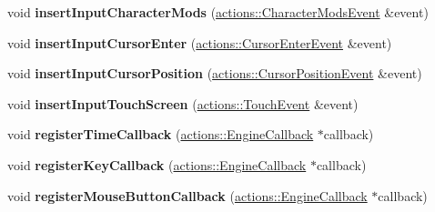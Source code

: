 \begin{DoxyCompactItemize}
\item 
\hypertarget{classfillwave_1_1Engine_a1d533273542291e94666e02bdf2035a6}{}void {\bfseries insert\+Input\+Character\+Mods} (\hyperlink{classfillwave_1_1actions_1_1CharacterModsEvent}{actions\+::\+Character\+Mods\+Event} \&event)\label{classfillwave_1_1Engine_a1d533273542291e94666e02bdf2035a6}

\item 
\hypertarget{classfillwave_1_1Engine_a1d9c62c6b661e6107493a5b389ad85e0}{}void {\bfseries insert\+Input\+Cursor\+Enter} (\hyperlink{classfillwave_1_1actions_1_1CursorEnterEvent}{actions\+::\+Cursor\+Enter\+Event} \&event)\label{classfillwave_1_1Engine_a1d9c62c6b661e6107493a5b389ad85e0}

\item 
\hypertarget{classfillwave_1_1Engine_aa3f48adc90b541d8aa0baddf08aa9cde}{}void {\bfseries insert\+Input\+Cursor\+Position} (\hyperlink{classfillwave_1_1actions_1_1CursorPositionEvent}{actions\+::\+Cursor\+Position\+Event} \&event)\label{classfillwave_1_1Engine_aa3f48adc90b541d8aa0baddf08aa9cde}

\item 
\hypertarget{classfillwave_1_1Engine_ab5968055d7a39120d2137ee0403bdc54}{}void {\bfseries insert\+Input\+Touch\+Screen} (\hyperlink{classfillwave_1_1actions_1_1TouchEvent}{actions\+::\+Touch\+Event} \&event)\label{classfillwave_1_1Engine_ab5968055d7a39120d2137ee0403bdc54}

\item 
\hypertarget{classfillwave_1_1Engine_a2076d62acd110d2677d7ed31c6340c86}{}void {\bfseries register\+Time\+Callback} (\hyperlink{classfillwave_1_1actions_1_1EngineCallback}{actions\+::\+Engine\+Callback} $\ast$callback)\label{classfillwave_1_1Engine_a2076d62acd110d2677d7ed31c6340c86}

\item 
\hypertarget{classfillwave_1_1Engine_a7b108f71e8ecab314fe18f281ebb1ee8}{}void {\bfseries register\+Key\+Callback} (\hyperlink{classfillwave_1_1actions_1_1EngineCallback}{actions\+::\+Engine\+Callback} $\ast$callback)\label{classfillwave_1_1Engine_a7b108f71e8ecab314fe18f281ebb1ee8}

\item 
\hypertarget{classfillwave_1_1Engine_a1736b1135a4f1a42cdd6830ec4b40c5b}{}void {\bfseries register\+Mouse\+Button\+Callback} (\hyperlink{classfillwave_1_1actions_1_1EngineCallback}{actions\+::\+Engine\+Callback} $\ast$callback)\label{classfillwave_1_1Engine_a1736b1135a4f1a42cdd6830ec4b40c5b}


\end{DoxyCompactItemize}
